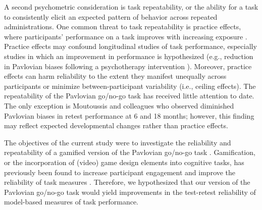 \documentclass[a4paper,12pt]{article}
\begin{document}
\begin{refsection}[main]
A second psychometric consideration is task repeatability, or the ability for a task to consistently elicit an expected pattern of behavior across repeated administrations. One common threat to task repeatability is practice effects, where participants’ performance on a task improves with increasing exposure \cite{hausknecht2007retesting, scharfen2018retest}. Practice effects may confound longitudinal studies of task performance, especially studies in which an improvement in performance is hypothesized (e.g., reduction in Pavlovian biases following a psychotherapy intervention \cite{geurts2022aversive}). Moreover, practice effects can harm reliability to the extent they manifest unequally across participants or minimize between-participant variability (i.e., ceiling effects). The repeatability of the Pavlovian go/no-go task has received little attention to date. The only exception is Moutoussis and colleagues \cite{moutoussis2018change} who observed diminished Pavlovian biases in retest performance at 6 and 18 months; however, this finding may reflect expected developmental changes \cite{raab2020adolescents, betts2020learning} rather than practice effects.  

The objectives of the current study were to investigate the reliability and repeatability of a gamified version of the Pavlovian go/no-go task \cite{weber2022effects}. Gamification, or the incorporation of (video) game design elements into cognitive tasks, has previously been found to increase participant engagement \cite{sailer2017gamification} and improve the reliability of task measures \cite{kucina2022solution, verdejo2021unified}. Therefore, we hypothesized that our version of the Pavlovian go/no-go task would yield improvements in the test-retest reliability of model-based measures of task performance. 



\end{refsection}
\end{document}
